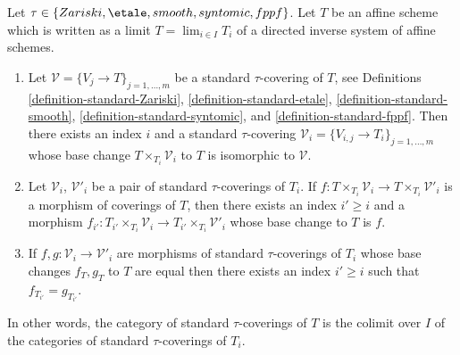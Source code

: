 \begin{lemma}
\label{lemma-limit-fppf-topology}
Let $\tau \in \{Zariski, \etale, smooth, syntomic, fppf\}$.
Let $T$ be an affine scheme which is written as a limit
$T = \lim_{i \in I} T_i$ of a directed inverse system of affine schemes.
\begin{enumerate}
\item Let $\mathcal{V} = \{V_j \to T\}_{j = 1, \ldots, m}$ be a
standard $\tau$-covering of $T$, see Definitions
\ref{definition-standard-Zariski},
\ref{definition-standard-etale},
\ref{definition-standard-smooth},
\ref{definition-standard-syntomic}, and
\ref{definition-standard-fppf}.
Then there exists an index $i$ and a standard $\tau$-covering
$\mathcal{V}_i = \{V_{i, j} \to T_i\}_{j = 1, \ldots, m}$
whose base change $T \times_{T_i} \mathcal{V}_i$ to $T$
is isomorphic to $\mathcal{V}$.
\item Let $\mathcal{V}_i$, $\mathcal{V}'_i$ be a pair of standard
$\tau$-coverings of $T_i$. If
$f : T \times_{T_i} \mathcal{V}_i \to T \times_{T_i} \mathcal{V}'_i$ is
a morphism of coverings of $T$, then there exists an index
$i' \geq i$ and a morphism
$f_{i'} : T_{i'} \times_{T_i} \mathcal{V}_i \to
T_{i'} \times_{T_i} \mathcal{V}'_i$
whose base change to $T$ is $f$.
\item If
$f, g : \mathcal{V}_i \to \mathcal{V}'_i$
are morphisms of standard $\tau$-coverings of $T_i$ whose
base changes $f_T, g_T$ to $T$ are equal then there exists an
index $i' \geq i$ such that $f_{T_{i'}} = g_{T_{i'}}$.
\end{enumerate}
In other words, the category of standard $\tau$-coverings of $T$ is
the colimit over $I$ of the categories of standard $\tau$-coverings of $T_i$.
\end{lemma}


